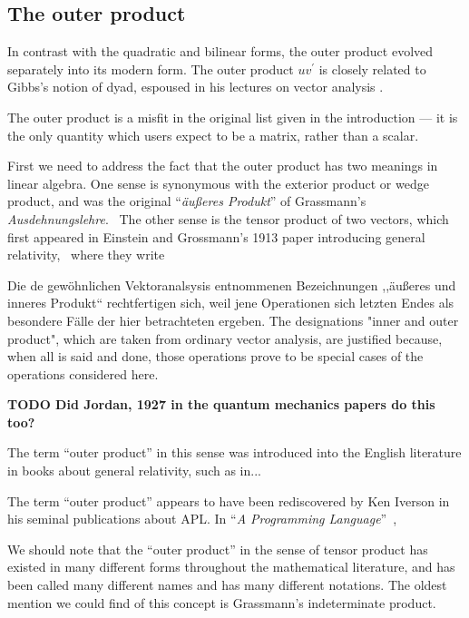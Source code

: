 \subsection{The outer product}

In contrast with the quadratic and bilinear forms, the outer product evolved separately into its modern form. The outer product $u v^\prime$ is closely related to Gibbs's notion of dyad, espoused in his lectures on vector analysis \cite{Gibbs1881,Wilson1901}.

The outer product is a misfit in the original list given in the introduction --- it is the only quantity which users expect to be a matrix, rather than a scalar.

First we need to address the fact that the outer product has two meanings in linear algebra. One sense is synonymous with the exterior product or wedge product, and was the original ``\textit{äußeres Produkt}'' of Grassmann's \textit{Ausdehnungslehre}.~\cite{Grassmann1844,Grassmann1862,Grassmann1995,Grassmann2000} The other sense is the tensor product of two vectors, which first appeared in Einstein and Grossmann's 1913 paper introducing general relativity,~\cite{Einstein1913} where they write

Die de gewöhnlichen Vektoranalsysis entnommenen Bezeichnungen ,,äußeres und inneres Produkt`` rechtfertigen sich, weil jene Operationen sich letzten Endes als besondere Fälle der hier betrachteten ergeben. The designations "inner and outer product", which are taken from ordinary vector analysis, are justified because, when all is said and done, those operations prove to be special cases of the operations considered here.~\cite[T. II, p. 26]{Einstein1913,Einstein1996}


\textbf{TODO Did Jordan, 1927 in the quantum mechanics papers do this too?}

The term ``outer product'' in this sense was introduced into the English literature in books about general relativity, such as in...

The term ``outer product'' appears to have been rediscovered by Ken Iverson in his seminal publications about APL. In ``\textit{A Programming Language}''~\cite{Iverson1962book},

We should note that the ``outer product'' in the sense of tensor product has existed in many different forms throughout the mathematical literature, and has been called many different names and has many different notations. The oldest mention we could find of this concept is Grassmann's indeterminate product.

